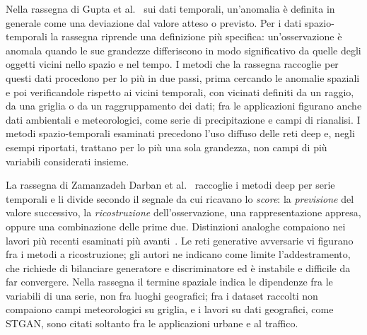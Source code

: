 Nella rassegna di Gupta et al.~\cite{gupta2014outlier} sui dati temporali, un'anomalia è definita in generale come una deviazione dal valore atteso o previsto. Per i dati spazio-temporali la rassegna riprende una definizione più specifica: un'osservazione è anomala quando le sue grandezze differiscono in modo significativo da quelle degli oggetti vicini nello spazio e nel tempo. I metodi che la rassegna raccoglie per questi dati procedono per lo più in due passi, prima cercando le anomalie spaziali e poi verificandole rispetto ai vicini temporali, con vicinati definiti da un raggio, da una griglia o da un raggruppamento dei dati; fra le applicazioni figurano anche dati ambientali e meteorologici, come serie di precipitazione e campi di rianalisi. I metodi spazio-temporali esaminati precedono l'uso diffuso delle reti deep e, negli esempi riportati, trattano per lo più una sola grandezza, non campi di più variabili considerati insieme.

La rassegna di Zamanzadeh Darban et al.~\cite{zamanzadehdarban2024survey} raccoglie i metodi deep per serie temporali e li divide secondo il segnale da cui ricavano lo \emph{score}: la \emph{previsione} del valore successivo, la \emph{ricostruzione} dell'osservazione, una rappresentazione appresa, oppure una combinazione delle prime due. Distinzioni analoghe compaiono nei lavori più recenti esaminati più avanti~\cite{wu2025catch,alnegheimish2025m2ad}. Le reti generative avversarie vi figurano fra i metodi a ricostruzione; gli autori ne indicano come limite l'addestramento, che richiede di bilanciare generatore e discriminatore ed è instabile e difficile da far convergere. Nella rassegna il termine spaziale indica le dipendenze fra le variabili di una serie, non fra luoghi geografici; fra i dataset raccolti non compaiono campi meteorologici su griglia, e i lavori su dati geografici, come STGAN, sono citati soltanto fra le applicazioni urbane e al traffico.

